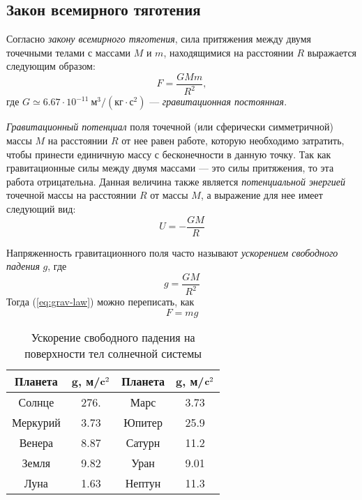 \subsection{Закон всемирного тяготения}
Согласно {\itshape закону всемирного тяготения}, сила притяжения 
между двумя точечными телами с массами $M$ и $m$,
находящимися на расстоянии $R$ выражается следующим
образом:\begin{equation}
	F=\frac{GMm}{R^2}, \label{eq:grav-law}
\end{equation}
где $G\simeq 6.67\cdot 10^{-11}~\text{м}^3 / 
\left( \text{кг} \cdot \text{с}^2 \right)$ --- 
{\itshape гравитационная постоянная}.

{\itshape Гравитационный потенциал} поля точечной (или сферически 
симметричной) массы $M$ на расстоянии $R$ от нее равен
работе, которую необходимо затратить, чтобы принести
единичную массу с бесконечности в данную точку. Так как
гравитационные силы между двумя массами --- это силы 
притяжения, то эта работа отрицательна. Данная
величина также является {\itshape потенциальной энергией} точечной
массы на расстоянии $R$ от массы $M$, а выражение для нее имеет 
следующий вид:\begin{equation}
U=-\frac{GM}{R}
\end{equation}

Напряженность гравитационного поля часто называют 
{\itshape ускорением свободного падения} $g$, где\begin{equation}
	g = \frac{GM}{R^2}
\end{equation}
Тогда (\ref{eq:grav-law}) можно переписать, как \begin{equation}
	F = mg
\end{equation}
\begin{table}[h!]
\centering
\begin{tabular}{|c|c|c|c|}
\hline 
{\bfseries Планета} & $\mathbf{g}$, 
{\bfseries м/$\text{\bfseries c}^2$} 
& {\bfseries Планета} & $\mathbf{g}$, 
{\bfseries м/$\text{\bfseries c}^2$}\\
\hline
Солнце & 276. & Марс & 3.73\\
\hline
Меркурий & 3.73 & Юпитер & 25.9\\
\hline
Венера & 8.87 & Сатурн & 11.2\\
\hline
Земля & 9.82 & Уран & 9.01\\
\hline
Луна & 1.63 & Нептун & 11.3\\
\hline
\end{tabular}
\caption{Ускорение свободного падения на поверхности тел 
солнечной системы}
\end{table}